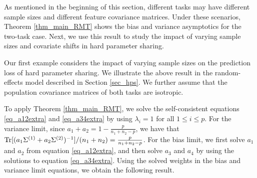 As mentioned in the beginning of this section, different tasks may have different sample sizes and different feature covariance matrices.
Under these scenarios, Theorem \ref{thm_main_RMT} shows the bias and variance asymptotics for the two-task case.
Next, we use this result to study the impact of varying sample sizes and covariate shifts in hard parameter sharing.

\begin{example}\label{ex_sample_ratio}
	Our first example considers the impact of varying sample sizes on the prediction loss of hard parameter sharing.
	We illustrate the above result in the random-effects model described in Section \ref{sec_hps}.
	We further assume that the population covariance matrices of both tasks are isotropic.

	To apply Theorem \ref{thm_main_RMT}, we solve the self-consistent equations \eqref{eq_a12extra} and \eqref{eq_a34extra} by using $\lambda_i = 1$ for all $1\le i\le p$.
	For the variance limit, since $a_1 + a_2 = 1 - \frac{p}{n_1 + n_2 - p}$, we have that $\operatorname{Tr}[(a_1\Sigma^{(1)} + a_2\Sigma^{(2)})^{-1}] / (n_1 + n_2) = \frac{p}{n_1 + n_2 - p}$.
	For the bias limit, we first solve $a_1$ and $a_2$ from equation \eqref{eq_a12extra}, and then solve $a_3$ and $a_4$ by using the solutions to equation \eqref{eq_a34extra}.
	Using the solved weights in the bias and variance limit equations, we obtain the following result.


\end{example}
